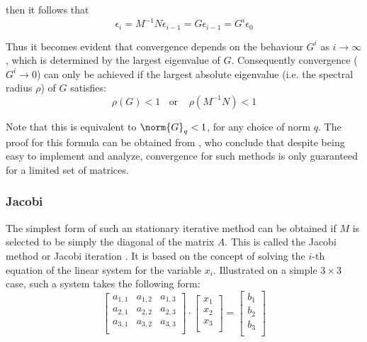 \noindent then it follows that
\begin{equation}
    \epsilon_i = M^{-1}N\epsilon_{i-1} = G\epsilon_{i-1}=G^i\epsilon_0
\end{equation}

\noindent Thus it becomes evident that convergence depends on the behaviour $G^i$ as $i \rightarrow \infty$, which is determined by the largest eigenvalue of $G$. Consequently convergence ($G^i \rightarrow 0$) can only be achieved if the largest absolute eigenvalue (i.e. the spectral radius $\rho$) of $G$ satisfies:
\begin{equation}
\label{eqn:convergence}
    \rho(G) < 1 \;\;\text{ or }\;\;\ \rho(M^{-1}N)<1 
\end{equation}

\noindent Note that this is equivalent to $\norm{G}_q<1$, for any choice of norm $q$. The proof for this formula can be obtained from \cite{golub_matrix_2013}, who conclude that despite being easy to implement and analyze, convergence for such methods is only guaranteed for a limited set of matrices.

\subsubsection{Jacobi}
The simplest form of such an stationary iterative method can be obtained if $M$ is selected to be simply the diagonal of the matrix $A$. This is called the Jacobi method or Jacobi iteration \cite{golub_matrix_2013}. It is based on the concept of solving the $i$-th equation of the linear system for the variable $x_i$. Illustrated on a simple $3 \times 3$ case, such a system takes the following form:
\begin{equation}
  \left[
    \begin{array}{ccc}
      a_{1,1} & a_{1,2} & a_{1,3} \\
      a_{2,1} & a_{2,2} & a_{2,3} \\
      a_{3,1} & a_{3,2} & a_{3,3} \\
    \end{array}
  \right] \cdot
  \left[
    \begin{array}{c}
      x_{1} \\
      x_{2} \\
      x_{3}  \\
    \end{array}
  \right] = 
  \left[
    \begin{array}{c}
      b_{1} \\
      b_{2} \\
      b_{3}  \\
    \end{array}
  \right] 
\end{equation}

